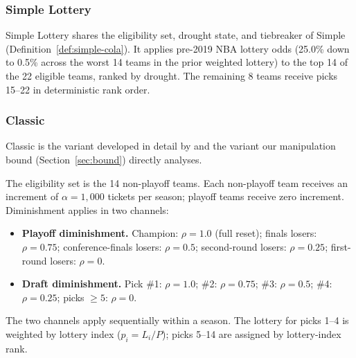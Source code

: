 \subsubsection{Simple Lottery \cola{}}

\begin{definition}
\label{def:simple-lot-cola}
Simple Lottery \cola{} shares the eligibility set, drought state, and tiebreaker of Simple \cola{} (Definition~\ref{def:simple-cola}). It applies pre-2019 NBA lottery odds (25.0\% down to 0.5\% across the worst 14 teams in the prior weighted lottery) to the top 14 of the 22 eligible teams, ranked by drought. The remaining 8 teams receive picks 15--22 in deterministic rank order.
\end{definition}

\subsubsection{Classic \cola{}}

Classic \cola{} is the variant developed in detail by \citet{highley2026cola} and the variant our manipulation bound (Section~\ref{sec:bound}) directly analyses.

\begin{definition}
\label{def:classic-cola}
The eligibility set is the 14 non-playoff teams. Each non-playoff team receives an increment of $\alpha = 1{,}000$ tickets per season; playoff teams receive zero increment. Diminishment applies in two channels:
\begin{itemize}
    \item \textbf{Playoff diminishment.} Champion: $\rho = 1.0$ (full reset); finals losers: $\rho = 0.75$; conference-finals losers: $\rho = 0.5$; second-round losers: $\rho = 0.25$; first-round losers: $\rho = 0$.
    \item \textbf{Draft diminishment.} Pick \#1: $\rho = 1.0$; \#2: $\rho = 0.75$; \#3: $\rho = 0.5$; \#4: $\rho = 0.25$; picks $\geq 5$: $\rho = 0$.
\end{itemize}
The two channels apply sequentially within a season. The lottery for picks 1--4 is weighted by lottery index ($p_i = L_i / P$); picks 5--14 are assigned by lottery-index rank.
\end{definition}


